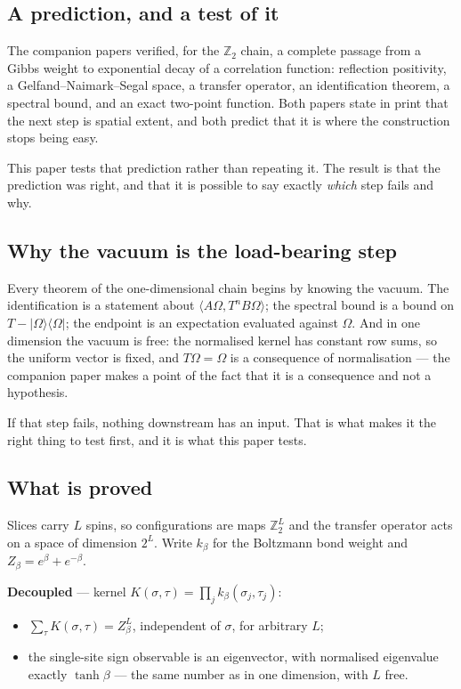 \documentclass[11pt]{article}
\theoremstyle{definition}
\newcommand{\Z}{\mathbb{Z}}
\newcommand{\Om}{\Omega}
\begin{document}
\subsection{A prediction, and a test of it}

The companion papers \cite{ErikssonOSChain, ErikssonQuotient} verified, for the
$\Z_2$ chain, a complete passage from a Gibbs weight to exponential decay of a
correlation function: reflection positivity, a Gelfand--Naimark--Segal space, a
transfer operator, an identification theorem, a spectral bound, and an exact
two-point function.  Both papers state in print that the next step is spatial
extent, and both predict that it is where the construction stops being easy.

This paper tests that prediction rather than repeating it.  The result is that
the prediction was right, and that it is possible to say exactly \emph{which}
step fails and why.

\subsection{Why the vacuum is the load-bearing step}

Every theorem of the one-dimensional chain begins by knowing the vacuum.  The
identification is a statement about $\langle A\Om, T^n B\Om\rangle$; the
spectral bound is a bound on $T-|\Om\rangle\langle\Om|$; the endpoint is an
expectation evaluated against $\Om$.  And in one dimension the vacuum is free:
the normalised kernel has constant row sums, so the uniform vector is fixed, and
$T\Om=\Om$ is a consequence of normalisation --- the companion paper makes a
point of the fact that it is a consequence and not a hypothesis.

If that step fails, nothing downstream has an input.  That is what makes it the
right thing to test first, and it is what this paper tests.

\subsection{What is proved}

Slices carry $L$ spins, so configurations are maps $\Z_2^{L}$ and the transfer
operator acts on a space of dimension $2^{L}$.  Write $k_\beta$ for the
Boltzmann bond weight and $Z_\beta=e^{\beta}+e^{-\beta}$.

\medskip
\noindent\textbf{Decoupled} --- kernel $K(\sigma,\tau)=\prod_j k_\beta(\sigma_j,\tau_j)$:
\begin{itemize}
\item $\sum_\tau K(\sigma,\tau) = Z_\beta^{L}$, independent of $\sigma$, for
      arbitrary $L$;
\item the single-site sign observable is an eigenvector, with normalised
      eigenvalue exactly $\tanh\beta$ --- the same number as in one dimension,
      with $L$ free.
\end{itemize}
\end{document}
